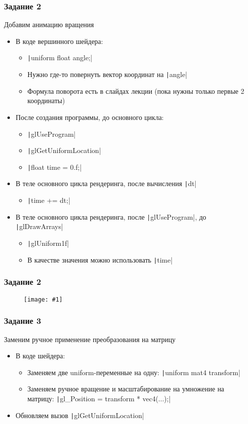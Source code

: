 \documentclass[10pt]{beamer}
\newcommand{\slideimage}[1]{
  \begin{figure}
    \begin{adjustbox}{width=\textwidth, totalheight=\textheight-2\baselineskip-2\baselineskip,keepaspectratio}
      \texttt{[image: \#1]}
    \end{adjustbox}
  \end{figure}
}
\begin{document}
\begin{frame}[fragile]
\frametitle{Задание 2}
Добавим анимацию вращения
\begin{itemize}
\item В коде вершинного шейдера:
\begin{itemize}
\item \texttt|uniform float angle;|
\item Нужно где-то повернуть вектор координат на \texttt|angle|
\item Формула поворота есть в слайдах лекции (пока нужны только первые 2 координаты)
\end{itemize}
\item После создания программы, до основного цикла:
\begin{itemize}
\item \texttt|glUseProgram|
\item \texttt|glGetUniformLocation|
\item \texttt|float time = 0.f;|
\end{itemize}
\item В теле основного цикла рендеринга, после вычисления \texttt|dt|
\begin{itemize}
\item \texttt|time += dt;|
\end{itemize}
\item В теле основного цикла рендеринга, после \texttt|glUseProgram|, до \texttt|glDrawArrays|
\begin{itemize}
\item \texttt|glUniform1f|
\item В качестве значения можно использовать \texttt|time|
\end{itemize}
\end{itemize}
\end{frame}

\begin{frame}
\frametitle{Задание 2}
\slideimage{2.png}
\end{frame}

\begin{frame}[fragile]
\frametitle{Задание 3}
Заменим ручное применение преобразования на матрицу
\begin{itemize}
\item В коде шейдера:
\begin{itemize}
\item Заменяем две uniform-переменные на одну: \texttt|uniform mat4 transform|
\item Заменяем ручное вращение и масштабирование на умножение на матрицу: \texttt|gl_Position = transform * vec4(...);|
\end{itemize}
\item Обновляем вызов \texttt|glGetUniformLocation|
\end{itemize}
\end{frame}
\end{document}
